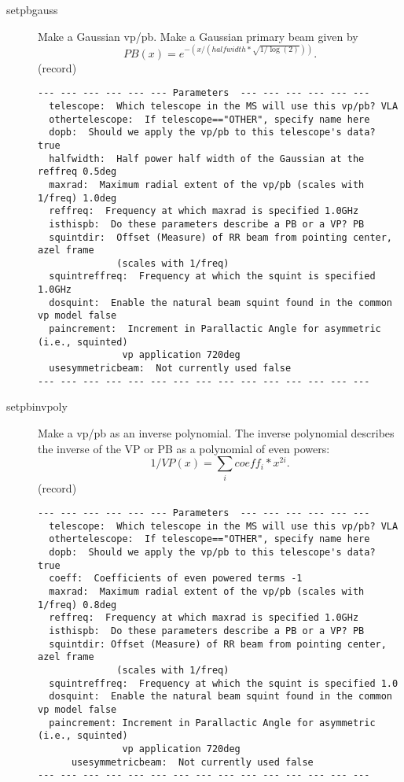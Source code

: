 \documentclass[12pt]{article}
\begin{document}
\begin{description}
 
  \item[setpbgauss]
   Make a Gaussian vp/pb.
   Make a Gaussian primary beam given by
   \begin{equation}
     PB(x) =  e^{- (x/(halfwidth*\sqrt{1/\log(2)})) }.
   \end{equation}
   (record)
{\small
\begin{verbatim}
--- --- --- --- --- --- Parameters  --- --- --- --- --- ---
  telescope:  Which telescope in the MS will use this vp/pb? VLA 
  othertelescope:  If telescope=="OTHER", specify name here 
  dopb:  Should we apply the vp/pb to this telescope's data? true 
  halfwidth:  Half power half width of the Gaussian at the reffreq 0.5deg 
  maxrad:  Maximum radial extent of the vp/pb (scales with 1/freq) 1.0deg 
  reffreq:  Frequency at which maxrad is specified 1.0GHz 
  isthispb:  Do these parameters describe a PB or a VP? PB 
  squintdir:  Offset (Measure) of RR beam from pointing center, azel frame 
              (scales with 1/freq) 
  squintreffreq:  Frequency at which the squint is specified 1.0GHz 
  dosquint:  Enable the natural beam squint found in the common vp model false 
  paincrement:  Increment in Parallactic Angle for asymmetric (i.e., squinted) 
               vp application 720deg 
  usesymmetricbeam:  Not currently used false 
--- --- --- --- --- --- --- --- --- --- --- --- --- --- ---
\end{verbatim} 
}
 
  \item[setpbinvpoly]
   Make a vp/pb as an inverse polynomial.
   The inverse polynomial describes the inverse of the VP or PB
   as a polynomial of even powers:
   \begin{equation}
     1/VP(x) = \sum_{i} coeff_{i} * x^{2i}.
   \end{equation}
   (record)

{\small
\begin{verbatim}
--- --- --- --- --- --- Parameters  --- --- --- --- --- ---
  telescope:  Which telescope in the MS will use this vp/pb? VLA 
  othertelescope:  If telescope=="OTHER", specify name here 
  dopb:  Should we apply the vp/pb to this telescope's data? true 
  coeff:  Coefficients of even powered terms -1 
  maxrad:  Maximum radial extent of the vp/pb (scales with 1/freq) 0.8deg 
  reffreq:  Frequency at which maxrad is specified 1.0GHz 
  isthispb:  Do these parameters describe a PB or a VP? PB 
  squintdir: Offset (Measure) of RR beam from pointing center, azel frame 
              (scales with 1/freq) 
  squintreffreq:  Frequency at which the squint is specified 1.0 
  dosquint:  Enable the natural beam squint found in the common vp model false 
  paincrement: Increment in Parallactic Angle for asymmetric (i.e., squinted) 
               vp application 720deg 
      usesymmetricbeam:  Not currently used false 
--- --- --- --- --- --- --- --- --- --- --- --- --- --- ---
\end{verbatim} 
}


\end{description}
\end{document}
